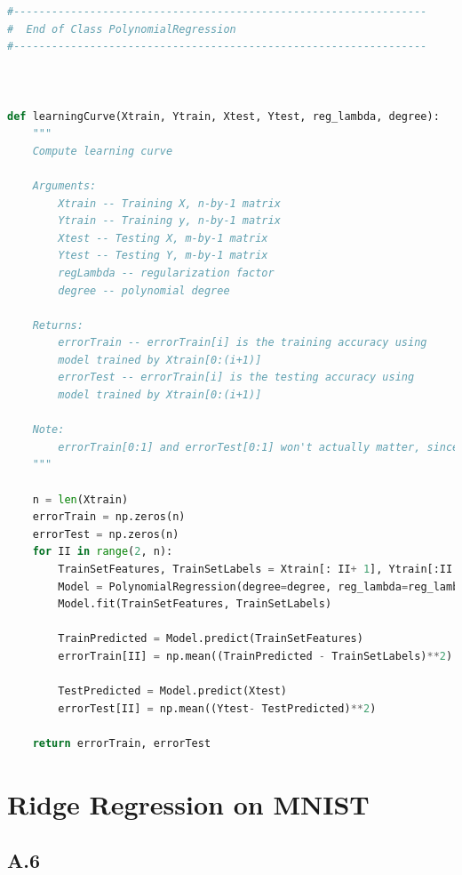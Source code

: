 \documentclass[]{article}
\begin{document}
\begin{lstlisting}[language=python]
#-----------------------------------------------------------------
#  End of Class PolynomialRegression
#-----------------------------------------------------------------



def learningCurve(Xtrain, Ytrain, Xtest, Ytest, reg_lambda, degree):
    """
    Compute learning curve

    Arguments:
        Xtrain -- Training X, n-by-1 matrix
        Ytrain -- Training y, n-by-1 matrix
        Xtest -- Testing X, m-by-1 matrix
        Ytest -- Testing Y, m-by-1 matrix
        regLambda -- regularization factor
        degree -- polynomial degree

    Returns:
        errorTrain -- errorTrain[i] is the training accuracy using
        model trained by Xtrain[0:(i+1)]
        errorTest -- errorTrain[i] is the testing accuracy using
        model trained by Xtrain[0:(i+1)]

    Note:
        errorTrain[0:1] and errorTest[0:1] won't actually matter, since we start displaying the learning curve at n = 2 (or higher)
    """

    n = len(Xtrain)
    errorTrain = np.zeros(n)
    errorTest = np.zeros(n)
    for II in range(2, n):
        TrainSetFeatures, TrainSetLabels = Xtrain[: II+ 1], Ytrain[:II + 1]
        Model = PolynomialRegression(degree=degree, reg_lambda=reg_lambda)
        Model.fit(TrainSetFeatures, TrainSetLabels)

        TrainPredicted = Model.predict(TrainSetFeatures)
        errorTrain[II] = np.mean((TrainPredicted - TrainSetLabels)**2)

        TestPredicted = Model.predict(Xtest)
        errorTest[II] = np.mean((Ytest- TestPredicted)**2)

    return errorTrain, errorTest

        \end{lstlisting}

\section*{Ridge Regression on MNIST}
    \subsection*{A.6}
\end{document}
